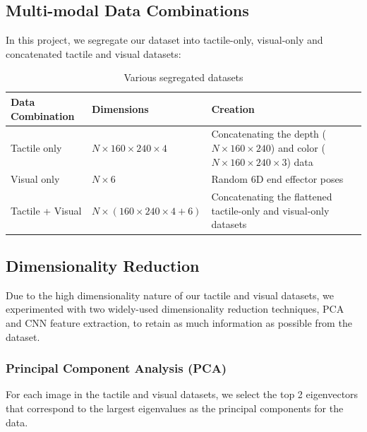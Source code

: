 \documentclass[11pt, a4paper]{report}
\theoremstyle{definition}
\begin{document}
\subsection{Multi-modal Data Combinations}
\label{sec:4.4.1}
In this project, we segregate our dataset into tactile-only, visual-only and concatenated tactile and visual datasets:
\begin{table}[H]
    \centering
    \begin{tabular}{|p{3cm}|p{4cm}|p{6cm}|}
        \hline
        Data Combination & Dimensions & Creation \\
        \hline
        Tactile only & $N\times160\times240\times4$ & Concatenating the depth ($N\times160\times240$) and color ($N\times160\times240\times3$) data \\
        \hline
        Visual only & $N\times6$ & Random 6D end effector poses \\
        \hline
        Tactile + Visual & $N\times(160\times240\times4+6)$ & Concatenating the flattened tactile-only and visual-only datasets \\
        \hline
    \end{tabular}
    \caption{Various segregated datasets}
    \label{tbl:4.1}
\end{table}


\subsection{Dimensionality Reduction}
\label{sec:4.4.2}
Due to the high dimensionality nature of our tactile and visual datasets, we experimented with two widely-used dimensionality reduction techniques, PCA and CNN feature extraction, to retain as much information as possible from the dataset.


\subsubsection{Principal Component Analysis (PCA)}
\label{sec:4.4.2.1}
For each image in the tactile and visual datasets, we select the top 2 eigenvectors that correspond to the largest eigenvalues as the principal components for the data.
\end{document}
